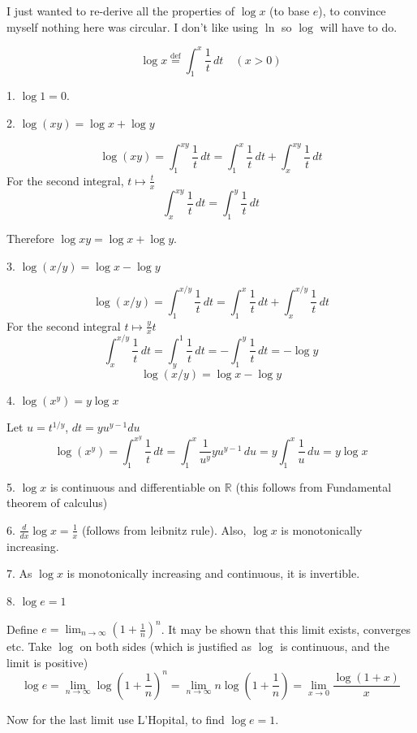 \documentclass[11]{article}
\title{\sc{Some Properties of the Natural Logarithm}}
\author{\sc{Rahul}}
\date{13 March, 2025}
\begin{document}
\maketitle
I just wanted to re-derive all the properties of $\log x$ (to base $e$), to convince myself nothing here was circular. I don't like using $\ln$ so $\log$ will have to do.

$$\log x \stackrel{\textrm{def}}{=} \int_{1}^{x} \frac1t \,dt \quad (x>0)$$

1. $\log 1 = 0$.

2. $\log(xy) = \log x+ \log y$

$$\log(xy) = \int_{1}^{xy} \frac1t \,dt = \int_{1}^{x} \frac1t \,dt + \int_{x}^{xy} \frac1t \,dt$$
For the second integral, $t \mapsto \frac{t}{x} $
$$\int_{x}^{xy} \frac1t \,dt = \int_{1}^{y} \frac1t \,dt$$

Therefore $\log xy = \log x + \log y$.


3. $\log(x/y) = \log x - \log y$

$$\log(x/y) = \int_{1}^{x/y} \frac1t \,dt = \int_{1}^{x} \frac1t \,dt + \int_{x}^{x/y} \frac1t \,dt$$
For the second integral $t \mapsto \frac{y}{x} t$
$$ \int_{x}^{x/y} \frac1t \,dt = \int_{y}^{1} \frac1t \,dt = - \int_{1}^{y} \frac1t \,dt = -\log y$$
$$\log(x/y) = \log x - \log y$$


4. $\log (x^y) = y \log x$

Let $u = t^{1/y}$, $dt = yu^{y-1} du$
$$\log(x^y) = \int_{1}^{x^y} \frac1t \,dt = \int_{1}^{x} \frac1{u^y} y u^{y-1}\,du = y \int_{1}^{x} \frac1u \,du = y \log x$$


5. $\log x$ is continuous and differentiable on $\mathbb{R}$ (this follows from Fundamental theorem of calculus)

6. $\frac{d}{dx} \log x = \frac1x$ (follows from leibnitz rule). Also, $\log x$ is monotonically increasing.

7. As $\log x$ is monotonically increasing and continuous, it is invertible.

8. $\log e = 1$

Define $e = \lim_{n \to \infty} \left(1 + \frac1n\right)^n$. It may be shown that this limit exists, converges etc. Take $\log$ on both sides (which is justified as $\log$ is continuous, and the limit is positive)
$$\log e = \lim_{n \to \infty} \log\left(1 + \frac1n\right)^n = \lim_{n \to \infty} n \log \left(1 + \frac1n\right) = \lim_{x \to 0} \frac{\log \left(1 + x\right)}{x}$$

Now for the last limit use L'Hopital, to find $\log e = 1$.
\end{document}
